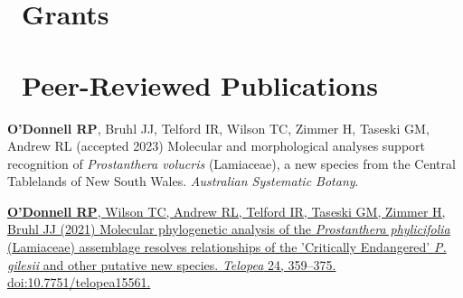 \documentclass[10,a4paper,]{awesome-cv}
\begin{document}
\hypertarget{grants}{%
\section{\texorpdfstring{\acvHeaderIconSep~Grants}{~Grants}}\label{grants}}

\begin{cventries}
    \vspace{-4.0mm}
\end{cventries}

\hypertarget{peer-reviewed-publications}{%
\section{\texorpdfstring{\acvHeaderIconSep~Peer-Reviewed
Publications}{~Peer-Reviewed Publications}}\label{peer-reviewed-publications}}

\textbf{O'Donnell RP}, Bruhl JJ, Telford IR, Wilson TC, Zimmer H,
Taseski GM, Andrew RL (accepted 2023) Molecular and morphological
analyses support recognition of \emph{Prostanthera volucris}
(Lamiaceae), a new species from the Central Tablelands of New South
Wales. \emph{Australian Systematic Botany}.

\href{https://openjournals.library.sydney.edu.au/index.php/TEL/article/view/15561}{\textbf{O'Donnell
RP}, Wilson TC, Andrew RL, Telford IR, Taseski GM, Zimmer H, Bruhl JJ
(2021) Molecular phylogenetic analysis of the \emph{Prostanthera
phylicifolia} (Lamiaceae) assemblage resolves relationships of the
'Critically Endangered' \emph{P. gilesii} and other putative new
species. \emph{Telopea} 24, 359--375. doi:10.7751/telopea15561.}
\end{document}

